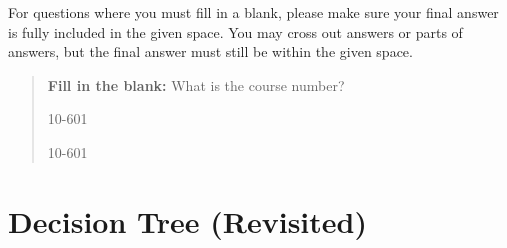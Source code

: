 \documentclass[11pt,addpoints,answers]{exam}
\begin{document}
For questions where you must fill in a blank, please make sure your final answer is fully included in the given space. You may cross out answers or parts of answers, but the final answer must still be within the given space.

\begin{quote}
\textbf{Fill in the blank:} What is the course number?

\begin{tcolorbox}[fit,height=1cm, width=4cm, blank, borderline={1pt}{-2pt},nobeforeafter]
    \begin{center}\huge10-601\end{center}
    \end{tcolorbox}\hspace{2cm}
    \begin{tcolorbox}[fit,height=1cm, width=4cm, blank, borderline={1pt}{-2pt},nobeforeafter]
    \begin{center}\huge10-601\end{center}
    \end{tcolorbox}
\end{quote}

\clearpage\clearpage

\section{Decision Tree (Revisited)}
\end{document}
